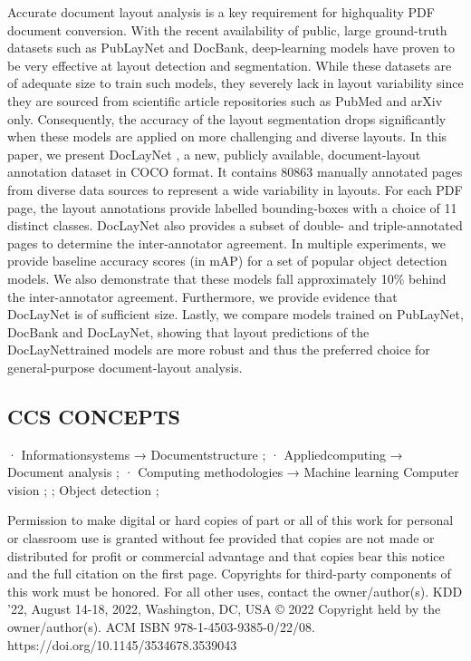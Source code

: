 Accurate document layout analysis is a key requirement for highquality PDF document conversion. With the recent availability of public, large ground-truth datasets such as PubLayNet and DocBank, deep-learning models have proven to be very effective at layout detection and segmentation. While these datasets are of adequate size to train such models, they severely lack in layout variability since they are sourced from scientific article repositories such as PubMed and arXiv only. Consequently, the accuracy of the layout segmentation drops significantly when these models are applied on more challenging and diverse layouts. In this paper, we present DocLayNet , a new, publicly available, document-layout annotation dataset in COCO format. It contains 80863 manually annotated pages from diverse data sources to represent a wide variability in layouts. For each PDF page, the layout annotations provide labelled bounding-boxes with a choice of 11 distinct classes. DocLayNet also provides a subset of double- and triple-annotated pages to determine the inter-annotator agreement. In multiple experiments, we provide baseline accuracy scores (in mAP) for a set of popular object detection models. We also demonstrate that these models fall approximately 10\% behind the inter-annotator agreement. Furthermore, we provide evidence that DocLayNet is of sufficient size. Lastly, we compare models trained on PubLayNet, DocBank and DocLayNet, showing that layout predictions of the DocLayNettrained models are more robust and thus the preferred choice for general-purpose document-layout analysis.

\subsection{CCS CONCEPTS}

· Informationsystems → Documentstructure ; · Appliedcomputing → Document analysis ; · Computing methodologies → Machine learning Computer vision ; ; Object detection ;

Permission to make digital or hard copies of part or all of this work for personal or classroom use is granted without fee provided that copies are not made or distributed for profit or commercial advantage and that copies bear this notice and the full citation on the first page. Copyrights for third-party components of this work must be honored. For all other uses, contact the owner/author(s). KDD '22, August 14-18, 2022, Washington, DC, USA © 2022 Copyright held by the owner/author(s). ACM ISBN 978-1-4503-9385-0/22/08. https://doi.org/10.1145/3534678.3539043

